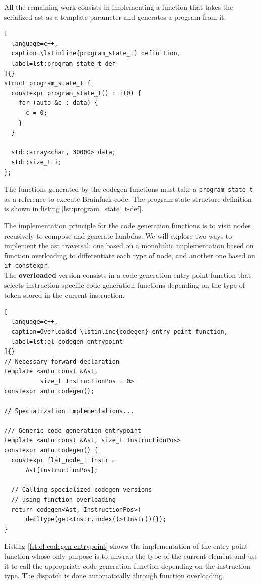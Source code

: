 \documentclass[../main]{subfiles}
\begin{document}
All the remaining work consists in implementing a function that takes the
serialized \gls{ast} as a template parameter and generates a program from it.

\begin{lstlisting}[
  language=c++,
  caption=\lstinline{program_state_t} definition,
  label=lst:program_state_t-def
]{}
struct program_state_t {
  constexpr program_state_t() : i(0) {
    for (auto &c : data) {
      c = 0;
    }
  }

  std::array<char, 30000> data;
  std::size_t i;
};
\end{lstlisting}

The functions generated by the codegen functions must take a
\lstinline{program_state_t} as a reference to execute Brainfuck code.
The program state structure definition is shown in listing
\ref{lst:program_state_t-def}.

The implementation principle for the code generation functions is to visit
nodes recusively to compose and generate lambdas.
We will explore two ways to implement the \gls{ast} traversal:
one based on a monolithic implementation based on function overloading
to differentiate each type of node, and another one based on
\lstinline{if constexpr}.
\\


The \textbf{overloaded} version consists in a code generation entry point function
that selects instruction-specific code generation functions depending
on the type of token stored in the current instruction.

\clearpage%

\begin{lstlisting}[
  language=c++,
  caption=Overloaded \lstinline{codegen} entry point function,
  label=lst:ol-codegen-entrypoint
]{}
// Necessary forward declaration
template <auto const &Ast,
          size_t InstructionPos = 0>
constexpr auto codegen();

// Specialization implementations...

/// Generic code generation entrypoint
template <auto const &Ast, size_t InstructionPos>
constexpr auto codegen() {
  constexpr flat_node_t Instr =
      Ast[InstructionPos];

  // Calling specialized codegen versions
  // using function overloading
  return codegen<Ast, InstructionPos>(
      decltype(get<Instr.index()>(Instr)){});
}
\end{lstlisting}

Listing \ref{lst:ol-codegen-entrypoint} shows the implementation
of the entry point function whose only purpose is to unwrap the type
of the current element and use it to call the appropriate code generation
function depending on the instruction type.
The dispatch is done automatically through function overloading.
\end{document}
